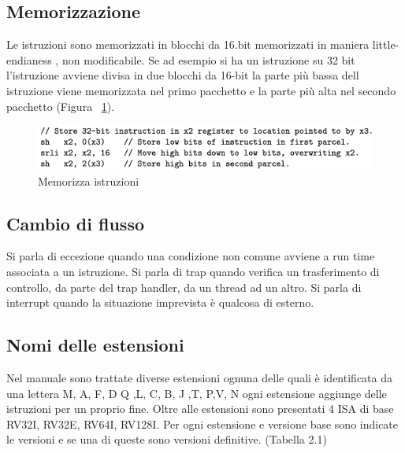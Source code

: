 \documentclass[12pt,a4paper]{report}
\begin{document}
\subsection{Memorizzazione} 
Le istruzioni sono memorizzati in blocchi da 16.bit memorizzati in maniera little-endianess , non modificabile. Se ad esempio si ha un istruzione su 32 bit l’istruzione avviene divisa in due blocchi da 16-bit la parte più bassa dell istruzione viene memorizzata nel primo pacchetto e la parte più alta nel secondo pacchetto (Figura~ \ref{fig:memorizza_Istruzioni}). 

\begin{figure}
\includegraphics[width = \textwidth]{SomeLineCodeRISC.png}
\caption{Memorizza istruzioni} 
\label{fig:memorizza_Istruzioni} 
\end{figure}

\subsection{Cambio di flusso}
Si parla di eccezione quando una condizione non comune avviene a run time associata a un istruzione.
Si parla di trap quando verifica un trasferimento di controllo, da parte del trap handler, da un thread ad un altro. Si parla di interrupt quando la situazione imprevista è qualcosa di esterno.

\subsection{Nomi delle estensioni}
Nel manuale sono trattate diverse estensioni ognuna delle quali è identificata da una lettera 
M, A, F, D Q ,L, C, B, J ,T, P,V, N ogni estensione aggiunge delle istruzioni per un proprio fine. Oltre alle estensioni sono presentati 4 ISA di base RV32I, RV32E, RV64I, RV128I. Per ogni estensione e versione base sono indicate le versioni e se una di queste sono versioni definitive.
(Tabella 2.1)
\end{document}
